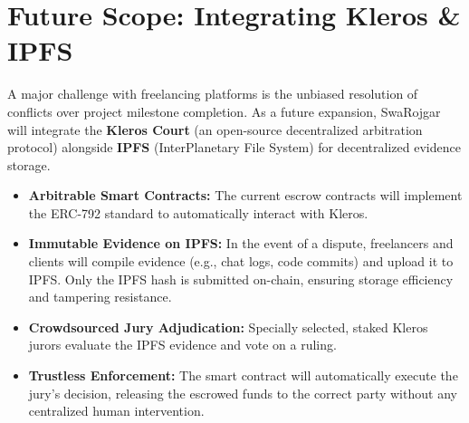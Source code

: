 \documentclass[11pt,a4paper]{article}
\begin{document}
\section{Future Scope: Integrating Kleros \& IPFS}
A major challenge with freelancing platforms is the unbiased resolution of conflicts over project milestone completion. As a future expansion, SwaRojgar will integrate the \textbf{Kleros Court} (an open-source decentralized arbitration protocol) alongside \textbf{IPFS} (InterPlanetary File System) for decentralized evidence storage.
\begin{itemize}[noitemsep,topsep=0pt]
    \item \textbf{Arbitrable Smart Contracts:} The current escrow contracts will implement the ERC-792 standard to automatically interact with Kleros.
    \item \textbf{Immutable Evidence on IPFS:} In the event of a dispute, freelancers and clients will compile evidence (e.g., chat logs, code commits) and upload it to IPFS. Only the IPFS hash is submitted on-chain, ensuring storage efficiency and tampering resistance.
    \item \textbf{Crowdsourced Jury Adjudication:} Specially selected, staked Kleros jurors evaluate the IPFS evidence and vote on a ruling. 
    \item \textbf{Trustless Enforcement:} The smart contract will automatically execute the jury’s decision, releasing the escrowed funds to the correct party without any centralized human intervention.
\end{itemize}
\end{document}

